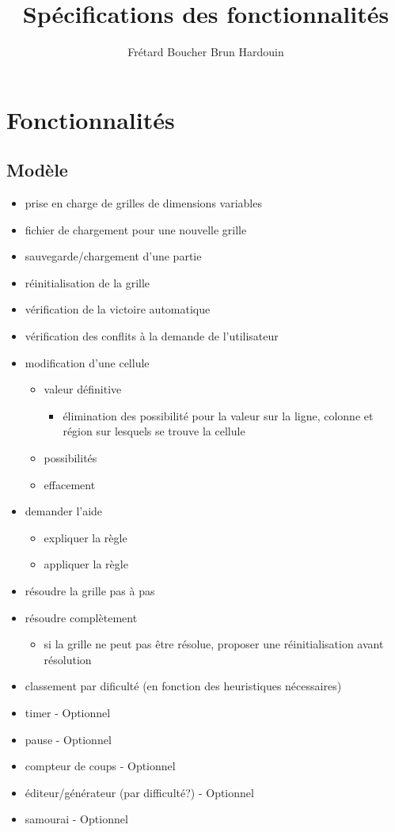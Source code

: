 \documentclass[a4paper,10pt]{report}
\title{Spécifications des fonctionnalités}
\author{Frétard Boucher Brun Hardouin}
\begin{document}
\maketitle

\chapter*{Fonctionnalités}
\section*{Modèle}

\begin{itemize}
 \item prise en charge de grilles de dimensions variables
 \item fichier de chargement pour une nouvelle grille
 \item sauvegarde/chargement d'une partie
 \item réinitialisation de la grille
 \item vérification de la victoire automatique
 \item vérification des conflits à la demande de l'utilisateur
 \item modification d'une cellule
 \begin{itemize}
  \item valeur définitive
  \begin{itemize}
   \item élimination des possibilité pour la valeur sur
   la ligne, colonne et région sur lesquels se trouve la cellule
  \end{itemize}
  \item possibilités
  \item effacement
 \end{itemize}
 \item demander l'aide
 \begin{itemize}
  \item expliquer la règle
  \item appliquer la règle
 \end{itemize}
 \item résoudre la grille pas à pas
 \item résoudre complètement
 \begin{itemize}
  \item si la grille ne peut pas être résolue,
  proposer une réinitialisation avant résolution
 \end{itemize}
 \item classement par dificulté (en fonction des heuristiques nécessaires)
 \item timer - Optionnel
 \item pause - Optionnel
 \item compteur de coups - Optionnel
 \item éditeur/générateur (par difficulté?) - Optionnel
 \item samourai - Optionnel
\end{itemize}
\end{document}
